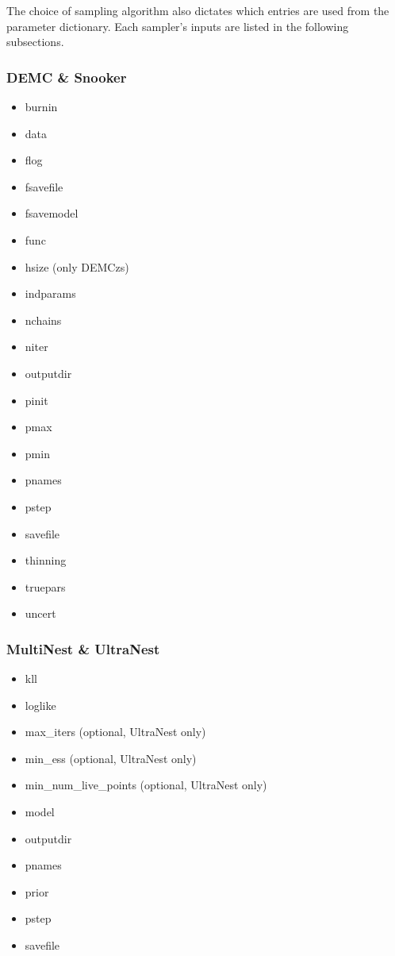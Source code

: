 \documentclass[letterpaper, 12pt]{article}
\begin{document}
\noindent The choice of sampling algorithm also dictates which entries 
are used from the parameter dictionary.  Each sampler's inputs are 
listed in the following subsections.

\subsubsection{DEMC \& Snooker}
\begin{itemize}
\item burnin
\item data
\item flog
\item fsavefile
\item fsavemodel
\item func
\item hsize (only DEMCzs)
\item indparams
\item nchains
\item niter
\item outputdir
\item pinit
\item pmax
\item pmin
\item pnames
\item pstep
\item savefile
\item thinning
\item truepars
\item uncert
\end{itemize}

\subsubsection{MultiNest \& UltraNest}
\begin{itemize}
\item kll
\item loglike
\item max\_iters (optional, UltraNest only)
\item min\_ess (optional, UltraNest only)
\item min\_num\_live\_points (optional, UltraNest only)
\item model
\item outputdir
\item pnames
\item prior
\item pstep
\item savefile
\end{itemize}
\end{document}
